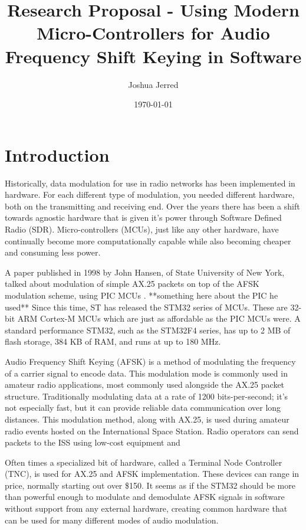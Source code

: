 \documentclass{article}[12pt,a4paper]
\title{Research Proposal - Using Modern Micro-Controllers for Audio Frequency Shift Keying in Software}
\author{Joshua Jerred}
\date{\today}
\begin{document}
\maketitle

\section*{Introduction}

Historically, data modulation for use in radio networks has been implemented in hardware. For each different type of modulation, you needed different hardware, both on the transmitting and receiving end. Over the years there has been a shift towards agnostic hardware that is given it's power through Software Defined Radio (SDR). Micro-controllers (MCUs), just like any other hardware, have continually become more computationally capable while also becoming cheaper and consuming less power.

A paper published in 1998 by John Hansen, of State University of New York, talked about modulation of simple AX.25 packets on top of the AFSK modulation scheme, using PIC MCUs \cite{hansen_ax25}. **something here about the PIC he used** Since this time, ST has released the STM32 series of MCUs. These are 32-bit ARM Cortex-M MCUs which are just as affordable as the PIC MCUs were. A standard performance STM32, such as the STM32F4 series, has up to 2 MB of flash storage, 384 KB of RAM, and runs at up to 180 MHz\cite{st_datasheet}.

Audio Frequency Shift Keying (AFSK) is a method of modulating the frequency of a carrier signal to encode data. This modulation mode is commonly used in amateur radio applications, most commonly used alongside the AX.25 packet structure. Traditionally modulating data at a rate of 1200 bits-per-second; it's not especially fast, but it can provide reliable data communication over long distances. This modulation method, along with AX.25, is used during amateur radio events hosted on the International Space Station. Radio operators can send packets to the ISS using low-cost equipment and 

Often times a specialized bit of hardware, called a Terminal Node Controller (TNC), is used for AX.25 and AFSK implementation. These devices can range in price, normally starting out over \$150. It seems as if the STM32 should be more than powerful enough to modulate and demodulate AFSK signals in software without support from any external hardware, creating common hardware that can be used for many different modes of audio modulation.
\end{document}
